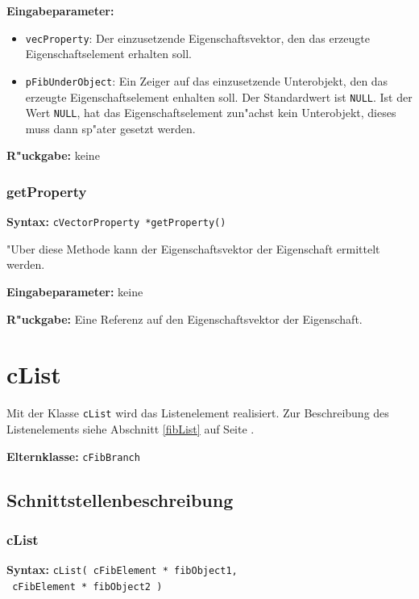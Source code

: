 \bigskip\noindent
\textbf{Eingabeparameter:}
\begin{itemize}
 \item \verb|vecProperty|: Der einzusetzende Eigenschaftsvektor, den das erzeugte Eigenschaftselement erhalten soll.
 \item \verb|pFibUnderObject|: Ein Zeiger auf das einzusetzende Unterobjekt, den das erzeugte Eigenschaftselement enhalten soll. Der Standardwert ist \verb|NULL|. Ist der Wert \verb|NULL|, hat das Eigenschaftselement zun"achst kein Unterobjekt, dieses muss dann sp"ater gesetzt werden.
\end{itemize}

\bigskip\noindent
\textbf{R"uckgabe:} keine


\subsubsection{getProperty}

\textbf{Syntax:} \verb|cVectorProperty *getProperty()|

\bigskip\noindent
"Uber diese Methode kann der Eigenschaftsvektor der Eigenschaft ermittelt werden.

\bigskip\noindent
\textbf{Eingabeparameter:} keine

\bigskip\noindent
\textbf{R"uckgabe:} Eine Referenz auf den Eigenschaftsvektor der Eigenschaft.


\section{cList}

Mit der Klasse \verb|cList| wird das Listenelement realisiert.
Zur Beschreibung des Listenelements siehe Abschnitt \ref{fibList} auf Seite \pageref{fibList} .

\bigskip\noindent
\textbf{Elternklasse:} \verb|cFibBranch|


\subsection{Schnittstellenbeschreibung}

\subsubsection{cList}

\textbf{Syntax:} \verb|cList( cFibElement * fibObject1,| \\\verb| cFibElement * fibObject2 )|

